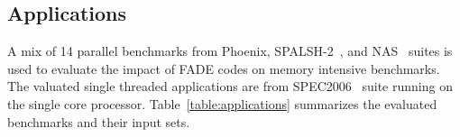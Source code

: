 %
%


\subsection{Applications}
A mix of 14 parallel benchmarks from Phoenix, SPALSH-2~\cite{Splash2}, and NAS~\cite{NAS} suites is used to evaluate the impact of FADE codes on memory intensive benchmarks.
The valuated single threaded applications are from SPEC2006~\cite{spec2006} suite running on the single core processor.
Table~\ref{table:applications} summarizes the evaluated benchmarks and their input sets.

